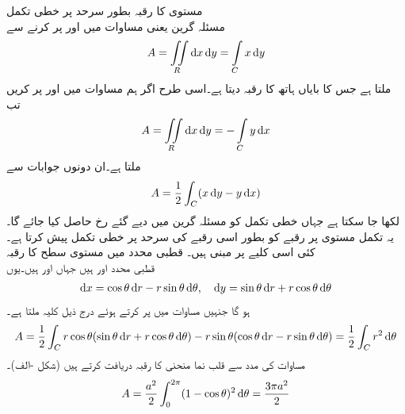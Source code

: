 \quad مستوی کا رقبہ بطور سرحد پر خطی تکمل\\
مسئلہ گرین یعنی مساوات  میں  اور  پر کرنے سے
\begin{align*}
A=\iint\limits_R \dif x\dif y=\int\limits_C x\dif y
\end{align*}
ملتا ہے جس کا بایاں ہاتھ  کا رقبہ  دیتا ہے۔اسی طرح اگر ہم مساوات   میں  اور  پر کریں تب
\begin{align*}
A=\iint\limits_R \dif x\dif y=-\int\limits_C y\dif x
\end{align*}
ملتا ہے۔ان دونوں جوابات سے
\begin{align}\label{مساوات_خطی_تکمل_سطح_پیما_الف}
A=\frac{1}{2}\int_C(x\dif y-y\dif x)
\end{align}
لکھا جا سکتا ہے جہاں خطی تکمل کو مسئلہ گرین میں دیے گئے رخ حاصل کیا جائے گا۔یہ تکمل مستوی  پر رقبے کو بطور اسی رقبے کی سرحد پر خطی تکمل پیش کرتا ہے۔ کئی  اسی کلیے پر مبنی ہیں۔
\quad قطبی محدد میں مستوی سطح کا رقبہ\\
قطبی محدد  اور  ہیں جہاں  اور   ہیں۔یوں
\begin{align*}
\dif x=\cos \theta\dif r-r\sin \theta \dif \theta,\quad \dif y=\sin \theta \dif r+r\cos \theta \dif \theta
\end{align*}
ہو گا جنہیں مساوات  میں پر کرتے ہوئے درج ذیل کلیہ ملتا ہے۔
\begin{align}\label{مساوات_خطی_تکمل_سطح_پیما_ب}
A=\frac{1}{2}\int_C r\cos \theta(\sin \theta \dif r+r\cos \theta \dif \theta)-r\sin \theta (\cos \theta\dif r-r\sin \theta \dif \theta)=\frac{1}{2}\int_C r^2\dif \theta
\end{align}
مساوات  کی مدد سے قلب نما منحنی  کا رقبہ دریافت کرتے ہیں (شکل -الف)۔
\begin{align*}
A=\frac{a^2}{2}\int_0^{2\pi}(1-\cos \theta)^2 \dif \theta=\frac{3\pi a^2}{2}
\end{align*}
%
